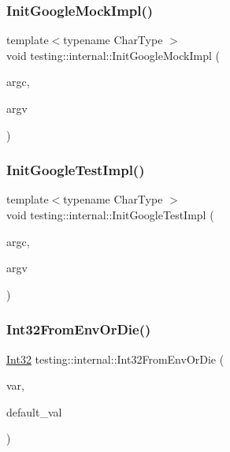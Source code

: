 \mbox{\label{namespacetesting_1_1internal_a3823844199df88af9493026031cf7744}} 
\subsubsection{\texorpdfstring{InitGoogleMockImpl()}{InitGoogleMockImpl()}}
{\footnotesize\ttfamily template$<$typename Char\+Type $>$ \\
void testing\+::internal\+::\+Init\+Google\+Mock\+Impl (\begin{DoxyParamCaption}\item[{int $\ast$}]{argc,  }\item[{Char\+Type $\ast$$\ast$}]{argv }\end{DoxyParamCaption})}

\mbox{\label{namespacetesting_1_1internal_ac3c6fa93391768aa91c6238b31aaeeb5}} 
\subsubsection{\texorpdfstring{InitGoogleTestImpl()}{InitGoogleTestImpl()}}
{\footnotesize\ttfamily template$<$typename Char\+Type $>$ \\
void testing\+::internal\+::\+Init\+Google\+Test\+Impl (\begin{DoxyParamCaption}\item[{int $\ast$}]{argc,  }\item[{Char\+Type $\ast$$\ast$}]{argv }\end{DoxyParamCaption})}

\mbox{\label{namespacetesting_1_1internal_a7e70cddd54da21e2c2608613d51288e2}} 
\subsubsection{\texorpdfstring{Int32FromEnvOrDie()}{Int32FromEnvOrDie()}}
{\footnotesize\ttfamily \mbox{\hyperlink{namespacetesting_1_1internal_af89e21e4043b5cf0c120af487b24fa06}{Int32}} testing\+::internal\+::\+Int32\+From\+Env\+Or\+Die (\begin{DoxyParamCaption}\item[{const char $\ast$}]{var,  }\item[{\mbox{\hyperlink{namespacetesting_1_1internal_af89e21e4043b5cf0c120af487b24fa06}{Int32}}}]{default\+\_\+val }\end{DoxyParamCaption})}

